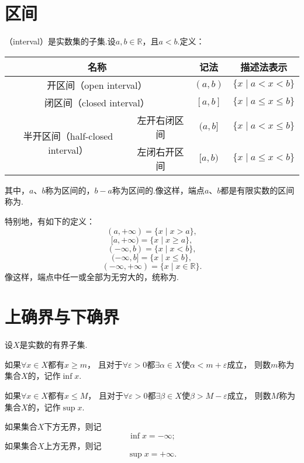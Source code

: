 \section{区间}
\begin{definition}
（interval）是实数集的子集.设\(a,b\in\mathbb{R}\)，且\(a<b\).定义：
\begin{center}
\begin{tabular}{|c|c|c|c|} \hline
\multicolumn{2}{|c|}{名称} & 记法 & 描述法表示 \\ \hline
\multicolumn{2}{|c|}{开区间（open interval）} & \((a,b)\) & \(\{ x \mid a < x < b \}\) \\ \hline
\multicolumn{2}{|c|}{闭区间（closed interval）} & \([a,b]\) & \(\{ x \mid a \leqslant x \leqslant b \}\) \\ \hline
\multirow{2}{*}{半开区间（half-closed interval）} & 左开右闭区间 & \((a,b]\) & \(\{ x \mid a < x \leqslant b \}\) \\ \cline{2-4}
& 左闭右开区间 & \([a,b)\) & \(\{ x \mid a \leqslant x < b \}\) \\ \hline
\end{tabular}
\end{center}
其中，\(a\)、\(b\)称为区间的，\(b-a\)称为区间的.像这样，端点\(a\)、\(b\)都是有限实数的区间称为.

特别地，有如下的定义：
\[ (a,+\infty) = \{ x \mid x > a\}, \]
\[ [a,+\infty) = \{ x \mid x \geqslant a\}, \]
\[ (-\infty,b) = \{ x \mid x < b\}, \]
\[ (-\infty,b] = \{ x \mid x \leqslant b\}, \]
\[ (-\infty,+\infty) = \{ x \mid x \in \mathbb{R} \}. \]
像这样，端点中任一或全部为无穷大的，统称为.
\end{definition}

\section{上确界与下确界}
\begin{definition}
设\(X\)是实数的有界子集.

如果\(\forall x \in X\)都有\(x \geqslant m\)，%
且对于\(\forall \varepsilon > 0\)都\(\exists \alpha \in X\)使\(\alpha < m + \varepsilon\)成立，%
则数\(m\)称为集合\(X\)的，记作\(\inf{x}\).

如果\(\forall x \in X\)都有\(x \leqslant M\)，%
且对于\(\forall \varepsilon > 0\)都\(\exists \beta \in X\)使\(\beta > M - \varepsilon\)成立，%
则数\(M\)称为集合\(X\)的，记作\(\sup{x}\).

如果集合\(X\)下方无界，则记\[
\inf{x} = -\infty;
\]如果集合\(X\)上方无界，则记\[
\sup{x} = +\infty.
\]
\end{definition}


